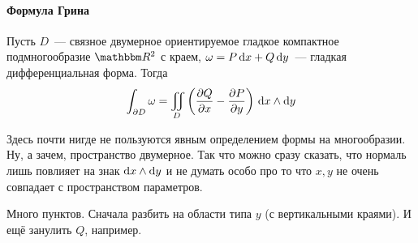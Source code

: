 \documentclass[draft,timbord]{longnotes}
\begin{document}
\paragraph{Формула Грина}
\label{par:dg::green}

\begin{thrm}\label{thrm:dg::green}
  Пусть $D$~--- связное двумерное ориентируемое гладкое компактное подмногообразие $\R^2$ с краем,
  $\omega = P \, \mathrm{d} x + Q\, \mathrm{d} y$~--- гладкая дифференциальная форма.
  Тогда
  \[
    \int_{\partial D} \omega = \iint _D \left(\frac{\partial Q}{\partial x} - \frac{\partial P}{\partial y}\right) \, \mathrm{d} x\wedge \mathrm{d} y
  \]
\end{thrm}

\begin{tproof}
  Здесь почти нигде не пользуются явным определением формы на многообразии. Ну, а зачем, 
  пространство двумерное. Так что можно сразу сказать, что нормаль лишь повлияет на знак
  $\mathrm{d} x \wedge \mathrm{d} y$ и не думать особо про то что $x,y$  не очень совпадает с пространством
  параметров.

  Много пунктов. Сначала разбить на области типа $y$ (с вертикальными краями). 
  И ещё занулить $Q$, например. 


\end{tproof}
\end{document}

